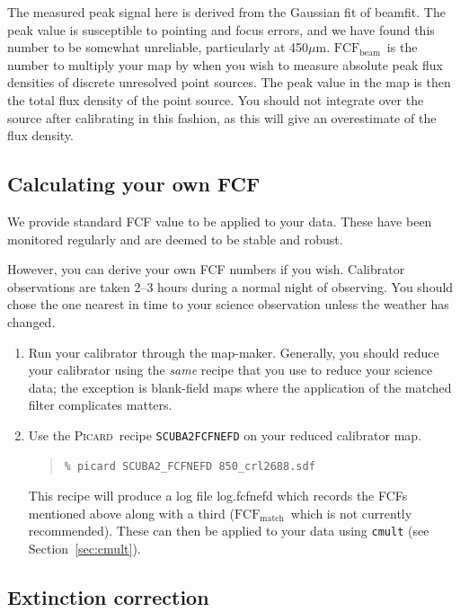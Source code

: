 \documentclass[twoside,11pt]{article}
\newcommand{\xref}[3]{#1}
\newcommand{\xlabel}[1]{}
\renewcommand{\_}{\texttt{\symbol{95}}}
\newenvironment{myquote}{\begin{quote}\begin{small}}{\end{small}\end{quote}}
\newcommand{\fcfb}{$\mathrm{FCF_{beam}}$}
\newcommand{\fcfm}{$\mathrm{FCF_{match}}$}
\newcommand{\picard}{\xref{\textsc{Picard}}{sun265}{}}
\newcommand{\task}[1]{\textsf{#1}}
\newcommand{\beamfit}{\xref{\task{beamfit}}{sun95}{BEAMFIT}}
\begin{document}
The measured peak signal here is derived from the Gaussian fit of
\beamfit. The peak value is susceptible to pointing and focus errors,
and we have found this number to be somewhat unreliable, particularly
at 450$\mu$m. \fcfb\ is the number to multiply your
map by when you wish to measure absolute peak flux densities of
discrete unresolved point sources. The peak value in the map is then
the total flux density of the point source. You should not integrate
over the source after calibrating in this fashion, as this will give
an overestimate of the flux density.


\subsection{\xlabel{ownfcf}Calculating your own FCF}

We provide standard FCF value to be applied to your data. These have
been monitored regularly and are deemed to be stable and robust.

However, you can derive your own FCF numbers if you wish. Calibrator
observations are taken 2--3 hours during a normal night of observing.
You should chose the one nearest in time to your science observation
unless the weather has changed.

\begin{enumerate}
\item Run your calibrator through the map-maker. Generally, you should
reduce your calibrator using the \emph{same} recipe that you use to
reduce your science data; the exception is blank-field maps where the
application of the matched filter complicates matters.

\item Use the \picard\ recipe \texttt{SCUBA2\_FCFNEFD} on your reduced calibrator map.
\begin{myquote}
\begin{verbatim}
% picard SCUBA2_FCFNEFD 850_crl2688.sdf
\end{verbatim}
\end{myquote}
This recipe will produce a log file log.fcfnefd which records the FCFs
mentioned above along with a third (\fcfm\ which is not currently
recommended). These can then be applied to your data using
\texttt{cmult} (see Section~\ref{sec:cmult}).
\end{enumerate}

\subsection{\xlabel{extinction}Extinction correction}
\end{document}
